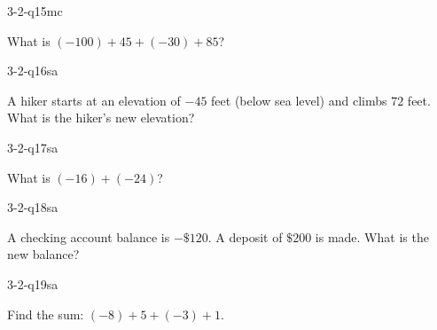 \begin{practiceQuestion}{3-2-q15}{mc}
\begin{questionText}
What is $(-100) + 45 + (-30) + 85$?
\end{questionText}
\end{practiceQuestion}


\begin{practiceQuestion}{3-2-q16}{sa}
\begin{questionText}
A hiker starts at an elevation of $-45$ feet (below sea level) and climbs $72$ feet. What is the hiker's new elevation?
\end{questionText}
\end{practiceQuestion}

\begin{practiceQuestion}{3-2-q17}{sa}
\begin{questionText}
What is $(-16) + (-24)$?
\end{questionText}
\end{practiceQuestion}

\begin{practiceQuestion}{3-2-q18}{sa}
\begin{questionText}
A checking account balance is $-\$120$. A deposit of $\$200$ is made. What is the new balance?
\end{questionText}
\end{practiceQuestion}

\begin{practiceQuestion}{3-2-q19}{sa}
\begin{questionText}
Find the sum: $(-8) + 5 + (-3) + 1$.
\end{questionText}
\end{practiceQuestion}

